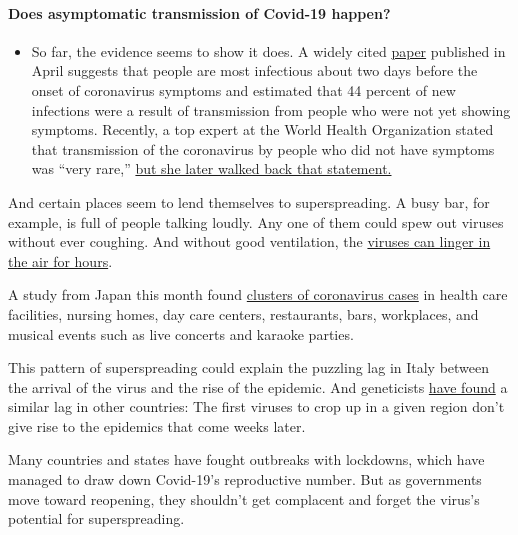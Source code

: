 \begin{itemize}
{  \paragraph{Does asymptomatic transmission of Covid-19
  happen?}\label{does-asymptomatic-transmission-of-covid-19-happen}}

  \begin{itemize}
  \tightlist
  \item
    So far, the evidence seems to show it does. A widely cited
    \href{https://www.nature.com/articles/s41591-020-0869-5}{paper}
    published in April suggests that people are most infectious about
    two days before the onset of coronavirus symptoms and estimated that
    44 percent of new infections were a result of transmission from
    people who were not yet showing symptoms. Recently, a top expert at
    the World Health Organization stated that transmission of the
    coronavirus by people who did not have symptoms was ``very rare,''
    \href{https://www.nytimes.com/2020/06/09/world/coronavirus-updates.html?action=click\&pgtype=Article\&state=default\&region=MAIN_CONTENT_3\&context=storylines_faq\#link-1f302e21}{but
    she later walked back that statement.}
  \end{itemize}
\end{itemize}

And certain places seem to lend themselves to superspreading. A busy
bar, for example, is full of people talking loudly. Any one of them
could spew out viruses without ever coughing. And without good
ventilation, the
\href{https://www.nytimes.com/2020/07/04/health/239-experts-with-one-big-claim-the-coronavirus-is-airborne.html}{viruses
can linger in the air for hours}.

A study from Japan this month found
\href{https://wwwnc.cdc.gov/eid/article/26/9/20-2272_article}{clusters
of coronavirus cases} in health care facilities, nursing homes, day care
centers, restaurants, bars, workplaces, and musical events such as live
concerts and karaoke parties.

This pattern of superspreading could explain the puzzling lag in Italy
between the arrival of the virus and the rise of the epidemic. And
geneticists
\href{https://www.nytimes.com/2020/05/27/health/coronavirus-spread-united-states.html}{have
found} a similar lag in other countries: The first viruses to crop up in
a given region don't give rise to the epidemics that come weeks later.

Many countries and states have fought outbreaks with lockdowns, which
have managed to draw down Covid-19's reproductive number. But as
governments move toward reopening, they shouldn't get complacent and
forget the virus's potential for superspreading.

